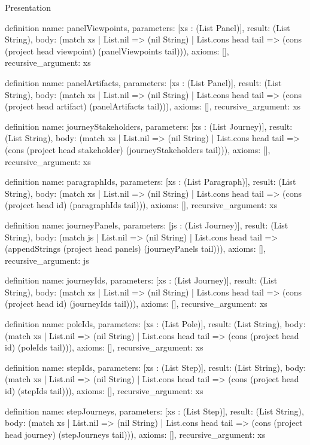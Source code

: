 \begin{lexlean}{Presentation}
\begin{semanticmodule}
definition{
  name: panelViewpoints,
  parameters: [xs : (List Panel)],
  result: (List String),
  body: (match xs
    | List.nil => (nil String)
    | List.cons head tail => (cons (project head viewpoint) (panelViewpoints tail))),
  axioms: [],
  recursive_argument: xs
}

definition{
  name: panelArtifacts,
  parameters: [xs : (List Panel)],
  result: (List String),
  body: (match xs
    | List.nil => (nil String)
    | List.cons head tail => (cons (project head artifact) (panelArtifacts tail))),
  axioms: [],
  recursive_argument: xs
}

definition{
  name: journeyStakeholders,
  parameters: [xs : (List Journey)],
  result: (List String),
  body: (match xs
    | List.nil => (nil String)
    | List.cons head tail => (cons (project head stakeholder) (journeyStakeholders tail))),
  axioms: [],
  recursive_argument: xs
}

definition{
  name: paragraphIds,
  parameters: [xs : (List Paragraph)],
  result: (List String),
  body: (match xs
    | List.nil => (nil String)
    | List.cons head tail => (cons (project head id) (paragraphIds tail))),
  axioms: [],
  recursive_argument: xs
}

definition{
  name: journeyPanels,
  parameters: [js : (List Journey)],
  result: (List String),
  body: (match js
    | List.nil => (nil String)
    | List.cons head tail => (appendStrings (project head panels) (journeyPanels tail))),
  axioms: [],
  recursive_argument: js
}

definition{
  name: journeyIds,
  parameters: [xs : (List Journey)],
  result: (List String),
  body: (match xs
    | List.nil => (nil String)
    | List.cons head tail => (cons (project head id) (journeyIds tail))),
  axioms: [],
  recursive_argument: xs
}

definition{
  name: poleIds,
  parameters: [xs : (List Pole)],
  result: (List String),
  body: (match xs
    | List.nil => (nil String)
    | List.cons head tail => (cons (project head id) (poleIds tail))),
  axioms: [],
  recursive_argument: xs
}

definition{
  name: stepIds,
  parameters: [xs : (List Step)],
  result: (List String),
  body: (match xs
    | List.nil => (nil String)
    | List.cons head tail => (cons (project head id) (stepIds tail))),
  axioms: [],
  recursive_argument: xs
}

definition{
  name: stepJourneys,
  parameters: [xs : (List Step)],
  result: (List String),
  body: (match xs
    | List.nil => (nil String)
    | List.cons head tail => (cons (project head journey) (stepJourneys tail))),
  axioms: [],
  recursive_argument: xs
}


\end{semanticmodule}
\end{lexlean}
